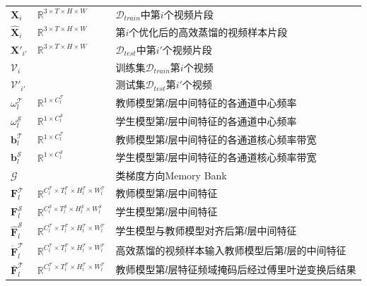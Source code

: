 \documentclass[10.5pt,letterpaper]{article}
\begin{document}
\begin{table}[!htb]
\begin{tabular}{lll}
		$\textbf{X}_i$  &            $\mathbb{R}^{3 \times T \times H \times W}$                                                                 & $\mathcal{D}_{train}$中第$i$个视频片段               \\
		$\hat{\textbf{X}}_i$&            $\mathbb{R}^{3 \times T \times H \times W}$                                                                 &第$i$个优化后的高效蒸馏的视频样本片段\\
		$\textbf{X}'_{i'}$  &            $\mathbb{R}^{3 \times T \times H \times W}$                                                                 & $\mathcal{D}_{test}$中第$i'$个视频片段                 \\
		$\mathcal{V}_i$&  &训练集$\mathcal{D}_{train}$第$i$个视频\\
		$\mathcal{V}'_{i'}$&  &测试集$\mathcal{D}_{test}$第$i'$个视频\\
		$\omega^\mathcal{T}_{l}$&  $\mathbb{R}^{1 \times C_l^\mathcal{T} }$ & 教师模型第$l$层中间特征的各通道中心频率\\
		$\omega^\mathcal{S}_{l}$&  $\mathbb{R}^{1 \times C_l^\mathcal{S} }$ & 学生模型第$l$层中间特征的各通道中心频率\\
		$\textbf{b}^\mathcal{T}_{l}$&  $\mathbb{R}^{1 \times C_l^\mathcal{T} }$ & 教师模型第$l$层中间特征的各通道核心频率带宽\\
		$\textbf{b}^\mathcal{S}_{l}$&  $\mathbb{R}^{1 \times C_l^\mathcal{S} }$ & 学生模型第$l$层中间特征的各通道核心频率带宽\\
		$\mathcal{G}$&  &类梯度方向Memory Bank \\
		$\textbf{F}_l^\mathcal{T}$&$\mathbb{R}^{C_l^\mathcal{T} \times T_l^\mathcal{T} \times  H_l^\mathcal{T}\times  W_l^\mathcal{T}}$&教师模型第$l$层中间特征\\
		$\textbf{F}_l^\mathcal{S}$&$\mathbb{R}^{C_l^\mathcal{S} \times T_l^\mathcal{S} \times  H_l^\mathcal{S}\times  W_l^\mathcal{S}}$&学生模型第$l$层中间特征\\
		$\hat{\textbf{F}}_l^\mathcal{S}$&$\mathbb{R}^{C_l^\mathcal{T} \times T_l^\mathcal{T} \times  H_l^\mathcal{T}\times  W_l^\mathcal{T}}$&学生模型与教师模型对齐后第$l$层中间特征\\
		$\dot{\textbf{F}}_l^\mathcal{T}$&$\mathbb{R}^{C_l^\mathcal{T} \times T_l^\mathcal{T} \times H_l^\mathcal{T} \times W_l^\mathcal{T}}$&高效蒸馏的视频样本输入教师模型后第$l$层的中间特征\\	
		$\bar{\textbf{F}}_l^\mathcal{T}$&$\mathbb{R}^{C_l^\mathcal{T} \times T_l^\mathcal{T} \times H_l^\mathcal{T} \times W_l^\mathcal{T}}$&教师模型第$l$层特征频域掩码后经过傅里叶逆变换后结果\\

\end{tabular}
\end{table}
\end{document}
